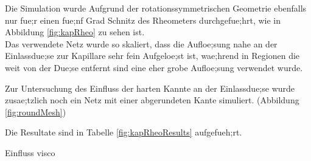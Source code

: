 Die Simulation wurde Aufgrund der rotationssymmetrischen Geometrie ebenfalls nur fue;r einen fue;nf Grad Schnitz  des Rheometers durchgefue;hrt, wie in Abbildung \ref{fig:kapRheo}  zu sehen ist.\\
Das verwendete Netz wurde so skaliert, dass die Aufloe;sung nahe an der Einlassdue;se zur Kapillare sehr fein Aufgeloe;st ist, wae;hrend in Regionen die weit von der Due;se entfernt sind eine eher grobe Aufloe;sung verwendet wurde.

Zur Untersuchung des Einfluss der harten Kannte an der Einlassdue;se wurde zusae;tzlich noch ein Netz mit einer abgerundeten Kante simuliert. (Abbildung \ref{fig:roundMesh})  

Die Resultate sind in Tabelle \ref{fig:kapRheoResults} aufgefueh;rt.

\begin{todocontent}
    \1 Einfluss visco
\end{todocontent}
%
